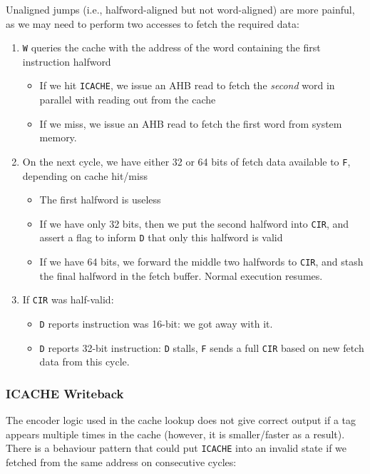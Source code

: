 \documentclass{article}
\begin{document}
Unaligned jumps (i.e., halfword-aligned but not word-aligned) are more painful, as we may need to perform two accesses to fetch the required data:

\begin{enumerate}
	\item \texttt{W} queries the cache with the address of the word containing the first instruction halfword
	\begin{itemize}
		\item If we hit \texttt{ICACHE}, we issue an AHB read to fetch the \textit{second} word in parallel with reading out from the cache
		\item If we miss, we issue an AHB read to fetch the first word from system memory.
	\end{itemize}
	\item On the next cycle, we have either 32 or 64 bits of fetch data available to \texttt{F}, depending on cache hit/miss
	\begin{itemize}
		\item The first halfword is useless
		\item If we have only 32 bits, then we put the second halfword into \texttt{CIR}, and assert a flag to inform \texttt{D} that only this halfword is valid
		\item If we have 64 bits, we forward the middle two halfwords to \texttt{CIR}, and stash the final halfword in the fetch buffer. Normal execution resumes.
	\end{itemize}
	\item If \texttt{CIR} was half-valid:
		\begin{itemize}
			\item \texttt{D} reports instruction was 16-bit: we got away with it.
			\item \texttt{D} reports 32-bit instruction: \texttt{D} stalls, \texttt{F} sends a full \texttt{CIR} based on new fetch data from this cycle.
		\end{itemize}
\end{enumerate}

\subsubsection{ICACHE Writeback}

The encoder logic used in the cache lookup does not give correct output if a tag appears multiple times in the cache (however, it is smaller/faster as a result). There is a behaviour pattern that could put \texttt{ICACHE} into an invalid state if we fetched from the same address on consecutive cycles:
\end{document}

